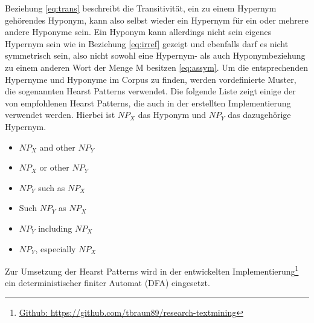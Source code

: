 Beziehung \ref{eq:trans} beschreibt die Transitivität, ein zu einem Hypernym gehörendes Hyponym, 
kann also selbst wieder ein Hypernym für ein oder mehrere andere Hyponyme sein.
Ein Hyponym kann allerdings nicht sein eigenes Hypernym sein wie in Beziehung \ref{eq:irref} gezeigt und ebenfalls darf es
nicht symmetrisch sein, also nicht sowohl eine Hypernym- als auch Hyponymbeziehung zu einem anderen Wort
der Menge M besitzen \ref{eq:assym}.
Um die entsprechenden Hypernyme und Hyponyme im Corpus zu finden, werden vordefinierte Muster, die sogenannten Hearst Patterns
verwendet. Die folgende Liste zeigt einige der von \cite{bib:Snow2004} empfohlenen Hearst Patterns, die auch in der erstellten
Implementierung verwendet werden. Hierbei ist $NP_{X}$ das Hyponym und $NP_{Y}$ das dazugehörige Hypernym.

\begin{itemize}
\item $NP_{X}$ and other $NP_{Y}$
\item $NP_{X}$ or other $NP_{Y}$
\item $NP_{Y}$ such as $NP_{X}$
\item Such $NP_{Y}$ as $NP_{X}$
\item $NP_{Y}$ including $NP_{X}$
\item $NP_{Y}$, especially $NP_{X}$
\end{itemize}

Zur Umsetzung der Hearst Patterns wird in der entwickelten Implementierung\footnote{\href{https://github.com/tbraun89/research-textmining}{Github:
 https://github.com/tbraun89/research-textmining}} ein deterministischer finiter Automat (DFA) eingesetzt. 
